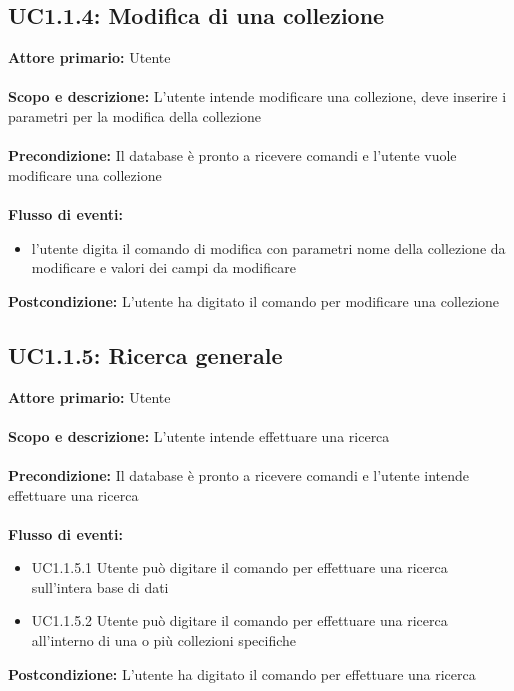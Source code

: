 \documentclass{scalatekids-article}
\begin{document}
\subsection{UC1.1.4: Modifica di una collezione}
\textbf{Attore primario:} Utente \\ \\
\textbf{Scopo e descrizione:} L’utente intende modificare una collezione, deve inserire i parametri per la modifica della collezione\\ \\
\textbf{Precondizione:} Il database è pronto a ricevere comandi e l’utente vuole modificare una collezione\\ \\
\textbf{Flusso di eventi:}
\begin{itemize}
\item l’utente digita il comando di modifica con parametri nome della collezione da modificare e valori dei campi da modificare
\end{itemize}
\textbf{Postcondizione:} L’utente ha digitato il comando per modificare una collezione
\subsection{UC1.1.5: Ricerca generale}

\textbf{Attore primario:} Utente \\ \\
\textbf{Scopo e descrizione:} L’utente intende effettuare una ricerca\\ \\
\textbf{Precondizione:} Il database è pronto a ricevere comandi e l’utente intende effettuare una ricerca\\ \\
\textbf{Flusso di eventi:}
\begin{itemize}
\item UC1.1.5.1 Utente può digitare il comando per effettuare una ricerca sull’intera base di dati
\item UC1.1.5.2 Utente può digitare il comando per effettuare una ricerca all’interno di una o più collezioni specifiche
\end{itemize}
\textbf{Postcondizione:} L’utente ha digitato il comando per effettuare una ricerca
\end{document}
